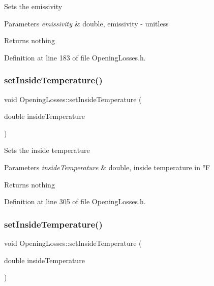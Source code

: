 Sets the emissivity


\begin{DoxyParams}{Parameters}
{\em emissivity} & double, emissivity -\/ unitless\\
\hline
\end{DoxyParams}
\begin{DoxyReturn}{Returns}
nothing 
\end{DoxyReturn}


Definition at line 183 of file Opening\+Losses.\+h.

\mbox{\label{class_opening_losses_a895dcaa81bbb3dc823ec903480f05262}} 
\subsubsection{\texorpdfstring{set\+Inside\+Temperature()}{setInsideTemperature()}\hspace{0.1cm}{\footnotesize\ttfamily [1/3]}}
{\footnotesize\ttfamily void Opening\+Losses\+::set\+Inside\+Temperature (\begin{DoxyParamCaption}\item[{double}]{inside\+Temperature }\end{DoxyParamCaption})\hspace{0.3cm}{\ttfamily [inline]}}

Sets the inside temperature


\begin{DoxyParams}{Parameters}
{\em inside\+Temperature} & double, inside temperature in °F\\
\hline
\end{DoxyParams}
\begin{DoxyReturn}{Returns}
nothing 
\end{DoxyReturn}


Definition at line 305 of file Opening\+Losses.\+h.

\mbox{\label{class_opening_losses_a895dcaa81bbb3dc823ec903480f05262}} 
\subsubsection{\texorpdfstring{set\+Inside\+Temperature()}{setInsideTemperature()}\hspace{0.1cm}{\footnotesize\ttfamily [2/3]}}
{\footnotesize\ttfamily void Opening\+Losses\+::set\+Inside\+Temperature (\begin{DoxyParamCaption}\item[{double}]{inside\+Temperature }\end{DoxyParamCaption})\hspace{0.3cm}{\ttfamily [inline]}}

